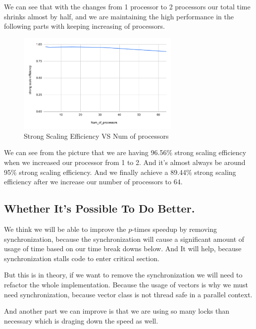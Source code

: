 \documentclass{article}
\begin{document}
We can see that with the changes from 1 processor to 2 processors our total time shrinks almost by half, and we are maintaining the high performance in the following parts with keeping increasing of processors.

\begin{figure}[H] %
\centering %
\includegraphics[width=0.7\textwidth]{strong scale efficiency vs. Num_of_processors.pdf} %
\caption{Strong Scaling Efficiency VS Num of processors} %
\label{Strong Scaling Efficiency VS Num of processors} %
\end{figure}

We can see from the picture that we are having 96.56\% strong scaling efficiency when we increased our processor from 1 to 2. And it's almost always be around 95\% strong scaling efficiency. And we finally achieve a 89.44\% strong scaling efficiency after we increase our number of processors to 64.
\subsection{Whether It's Possible To Do Better.}


We think we will be able to improve the $p$-times speedup by removing synchronization, because the synchronization will cause a significant amount of usage of time based on our time break downs below. And It will help, because synchronization stalls code to enter critical section.

But this is in theory, if we want to remove the synchronization we will need to refactor the whole implementation. Because the usage of vectors is why we must need synchronization, because vector class is not thread safe in a parallel context.

And another part we can improve is that we are using so many locks than necessary which is draging down the speed as well.
\end{document}
